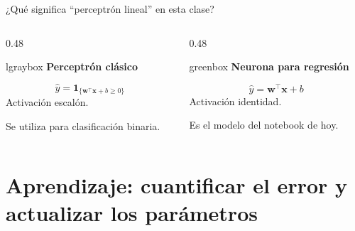 \documentclass[10pt,aspectratio=169,xcolor={dvipsnames}]{beamer}
\newenvironment{caja}[1][lgraybox]{\begin{beamercolorbox}[sep=0.7em,wd=\linewidth]{#1}}{\end{beamercolorbox}}
\begin{document}
\begin{frame}{¿Qué significa ``perceptrón lineal'' en esta clase?}
    \begin{columns}[T]
        \begin{column}{0.48\textwidth}
            \begin{caja}
                \textbf{Perceptrón clásico}\par\medskip
                \[\hat y=\mathbf{1}_{\{\bm w^\top\bm x+b\geq0\}}\]
                Activación escalón.\par\smallskip
                Se utiliza para clasificación binaria.
            \end{caja}
        \end{column}
        \begin{column}{0.48\textwidth}
            \begin{caja}[greenbox]
                \textbf{Neurona para regresión}\par\medskip
                \[\hat y=\bm w^\top\bm x+b\]
                Activación identidad.\par\smallskip
                Es el modelo del notebook de hoy.
            \end{caja}
        \end{column}
    \end{columns}
    \vspace{5mm}
\end{frame}

\section{Aprendizaje: cuantificar el error y actualizar los parámetros}
\end{document}
